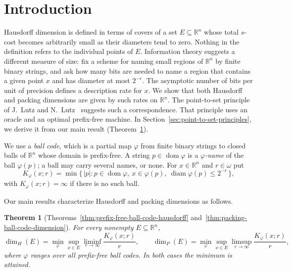\documentclass[a4paper,oneside,reqno,12pt]{amsart}
\theoremstyle{plain}
\newtheorem{theorem}{Theorem}[section]
\theoremstyle{definition}
\theoremstyle{remark}
\DeclareMathOperator{\dom}{dom}
\DeclareMathOperator{\diam}{diam}
\begin{document}
\maketitle


\section{Introduction}
\label{sec:introduction}

Hausdorff dimension is defined in terms of covers of a set
\(E\subseteq\mathbb R^n\) whose total \(s\)-cost becomes arbitrarily small as
their diameters tend to zero.  Nothing in the definition refers to the
individual points of \(E\).  Information theory
suggests a different measure of size: fix a scheme for naming small regions of
\(\mathbb R^n\) by finite binary strings, and ask how many bits are needed to name
a region that contains a given point \(x\) and has diameter at most \(2^{-r}\).
The asymptotic number of bits per unit of precision defines a description rate
for \(x\).  We show that both Hausdorff and packing dimensions are given by
such rates on \(\mathbb R^n\).  The point-to-set principle of J.~Lutz and
N.~Lutz~\cite{LutzLutz2018} suggests such a correspondence.  That principle uses
an oracle and an optimal prefix-free machine.  In
Section~\ref{sec:point-to-set-principles}, we derive it from our main result (Theorem~\ref{thm:intro-main}).

We use a \emph{ball code},
which is a partial map \(\varphi\) from finite binary strings to
closed balls of \(\mathbb R^n\) whose domain is prefix-free.  A string
\(p\in\dom\varphi\) is a \emph{\(\varphi\)-name} of the ball
\(\varphi(p)\); a ball may carry several names, or none.  For \(x\in\mathbb R^n\) and
\(r\in\omega\) put
\[
K_\varphi(x;r)
=
\min\bigl\{\,|p| : p\in\dom\varphi,\ x\in\varphi(p),\
\diam\varphi(p)\le 2^{-r}\,\bigr\},
\]
with \(K_\varphi(x;r)=\infty\) if there is no such ball.

Our main results characterize Hausdorff and packing dimensions
as follows.

\begin{theorem}[Theorems~\ref{thm:prefix-free-ball-code-hausdorff}
and~\ref{thm:packing-ball-code-dimension}]
\label{thm:intro-main}
For every nonempty \(E\subseteq\mathbb R^n\),
\begin{equation}
\label{eq:intro-classical}
\dim_H(E)
=
\min_{\varphi}
\sup_{x\in E}
\liminf_{r\to\infty}\frac{K_\varphi(x;r)}{r},
\qquad
\dim_P(E)
=
\min_{\varphi}
\sup_{x\in E}
\limsup_{r\to\infty}\frac{K_\varphi(x;r)}{r},
\end{equation}
where \(\varphi\) ranges over all prefix-free ball codes.  In both cases the
minimum is attained.
\end{theorem}
\end{document}
